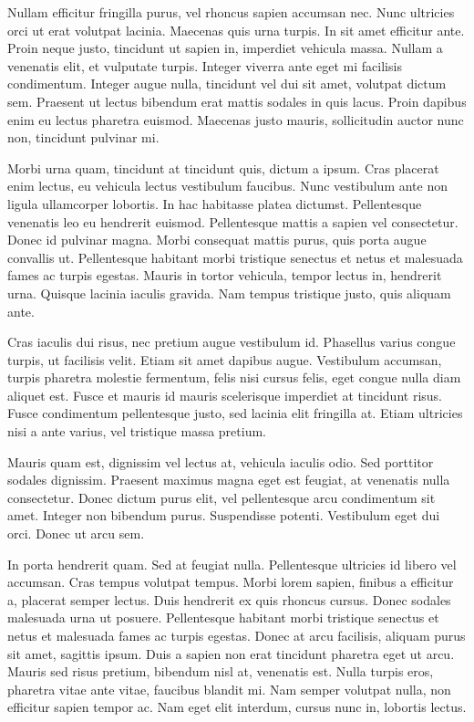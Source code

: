 \documentclass{homework}
\begin{document}
Nullam efficitur fringilla purus, vel rhoncus sapien accumsan nec. Nunc ultricies orci ut erat volutpat lacinia. Maecenas quis urna turpis. In sit amet efficitur ante. Proin neque justo, tincidunt ut sapien in, imperdiet vehicula massa. Nullam a venenatis elit, et vulputate turpis. Integer viverra ante eget mi facilisis condimentum. Integer augue nulla, tincidunt vel dui sit amet, volutpat dictum sem. Praesent ut lectus bibendum erat mattis sodales in quis lacus. Proin dapibus enim eu lectus pharetra euismod. Maecenas justo mauris, sollicitudin auctor nunc non, tincidunt pulvinar mi.

Morbi urna quam, tincidunt at tincidunt quis, dictum a ipsum. Cras placerat enim lectus, eu vehicula lectus vestibulum faucibus. Nunc vestibulum ante non ligula ullamcorper lobortis. In hac habitasse platea dictumst. Pellentesque venenatis leo eu hendrerit euismod. Pellentesque mattis a sapien vel consectetur. Donec id pulvinar magna. Morbi consequat mattis purus, quis porta augue convallis ut. Pellentesque habitant morbi tristique senectus et netus et malesuada fames ac turpis egestas. Mauris in tortor vehicula, tempor lectus in, hendrerit urna. Quisque lacinia iaculis gravida. Nam tempus tristique justo, quis aliquam ante.

Cras iaculis dui risus, nec pretium augue vestibulum id. Phasellus varius congue turpis, ut facilisis velit. Etiam sit amet dapibus augue. Vestibulum accumsan, turpis pharetra molestie fermentum, felis nisi cursus felis, eget congue nulla diam aliquet est. Fusce et mauris id mauris scelerisque imperdiet at tincidunt risus. Fusce condimentum pellentesque justo, sed lacinia elit fringilla at. Etiam ultricies nisi a ante varius, vel tristique massa pretium.

Mauris quam est, dignissim vel lectus at, vehicula iaculis odio. Sed porttitor sodales dignissim. Praesent maximus magna eget est feugiat, at venenatis nulla consectetur. Donec dictum purus elit, vel pellentesque arcu condimentum sit amet. Integer non bibendum purus. Suspendisse potenti. Vestibulum eget dui orci. Donec ut arcu sem.

In porta hendrerit quam. Sed at feugiat nulla. Pellentesque ultricies id libero vel accumsan. Cras tempus volutpat tempus. Morbi lorem sapien, finibus a efficitur a, placerat semper lectus. Duis hendrerit ex quis rhoncus cursus. Donec sodales malesuada urna ut posuere. Pellentesque habitant morbi tristique senectus et netus et malesuada fames ac turpis egestas. Donec at arcu facilisis, aliquam purus sit amet, sagittis ipsum. Duis a sapien non erat tincidunt pharetra eget ut arcu. Mauris sed risus pretium, bibendum nisl at, venenatis est. Nulla turpis eros, pharetra vitae ante vitae, faucibus blandit mi. Nam semper volutpat nulla, non efficitur sapien tempor ac. Nam eget elit interdum, cursus nunc in, lobortis lectus.
\end{document}
